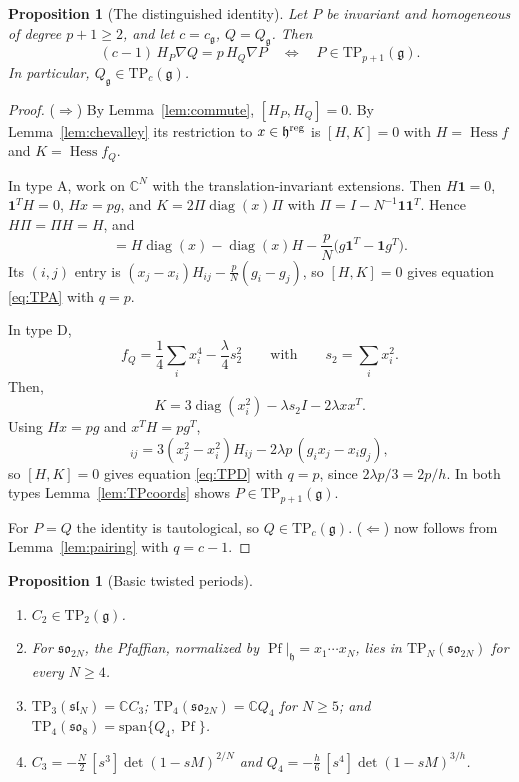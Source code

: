 \documentclass[10pt,reqno]{amsart}
\numberwithin{equation}{section}
\theoremstyle{plain}
\newtheorem{proposition}[theorem]{Proposition}
\theoremstyle{definition}
\DeclareMathOperator{\Pf}{Pf}
\DeclareMathOperator{\Hess}{Hess}
\DeclareMathOperator{\diag}{diag}
\newcommand{\TP}{\mathrm{TP}}
\begin{document}
\begin{proposition}[The distinguished identity]\label{prop:identity-TP}
Let $P$ be invariant and homogeneous of degree $p+1\ge2$, and let $c=c_\mathfrak{g}$, $Q=Q_\mathfrak{g}$. Then
\begin{equation}
	(c-1)\,H_P\nabla Q=p\,H_Q\nabla P\quad\Longleftrightarrow\quad P\in\TP_{p+1}(\mathfrak{g}).
\end{equation}
In particular, $Q_\mathfrak{g}\in\TP_c(\mathfrak{g})$.
\end{proposition}

\begin{proof}
($\Rightarrow$) By Lemma~\ref{lem:commute}, $[H_P,H_Q]=0$. By Lemma~\ref{lem:chevalley} its restriction to $x\in\mathfrak{h}^{\rm reg}$ is $[H,K]=0$ with $H=\Hess f$ and $K=\Hess f_Q$.

In type A, work on $\mathbb{C}^N$ with the translation-invariant extensions. Then $H\mathbf 1=0$, $\mathbf 1^TH=0$, $Hx=pg$, and $K=2\Pi\diag(x)\Pi$ with $\Pi=I-N^{-1}\mathbf 1\mathbf 1^T$. Hence $H\Pi=\Pi H=H$, and
\begin{equation*}
	[H,\Pi\diag(x)\Pi]=H\diag(x)-\diag(x)H-\frac pN\big(g\mathbf 1^T-\mathbf 1g^T\big).
\end{equation*}
Its $(i,j)$ entry is $(x_j-x_i)H_{ij}-\tfrac pN(g_i-g_j)$, so $[H,K]=0$ gives equation \eqref{eq:TPA} with $q=p$.

In type D,
\begin{equation*}
    f_Q=\frac14\sum_ix_i^4-\frac\lambda4s_2^2\qquad\text{with}\qquad s_2=\sum_ix_i^2.
\end{equation*}
Then,
\begin{equation*}
	K=3\diag(x_i^2)-\lambda s_2I-2\lambda xx^T .
\end{equation*}
Using $Hx=pg$ and $x^TH=pg^T$,
\begin{equation*}
	[H,K]_{ij}=3(x_j^2-x_i^2)H_{ij}-2\lambda p\,(g_ix_j-x_ig_j),
\end{equation*}
so $[H,K]=0$ gives equation \eqref{eq:TPD} with $q=p$, since $2\lambda p/3=2p/h$. In both types Lemma~\ref{lem:TPcoords} shows $P\in\TP_{p+1}(\mathfrak{g})$.

For $P=Q$ the identity is tautological, so $Q\in\TP_c(\mathfrak{g})$. ($\Leftarrow$) now follows from Lemma~\ref{lem:pairing} with $q=c-1$.
\end{proof}

\begin{proposition}[Basic twisted periods]\label{prop:basicTP}
\leavevmode
\begin{enumerate}[label=(\roman*)]
	\item $C_2\in\TP_2(\mathfrak{g})$.
	\item For $\mathfrak{so}_{2N}$, the Pfaffian, normalized by $\Pf|_\mathfrak{h}=x_1\cdots x_N$, lies in $\TP_N(\mathfrak{so}_{2N})$ for every $N\ge4$.
	\item $\TP_3(\mathfrak{sl}_N)=\mathbb{C} C_3$; $\TP_4(\mathfrak{so}_{2N})=\mathbb{C} Q_4$ for $N\ge5$; and $\TP_4(\mathfrak{so}_8)=\mathrm{span}\{Q_4,\Pf\}$.
	\item $C_3=-\tfrac N2\,[s^3]\det(1-sM)^{2/N}$ and $Q_4=-\tfrac h6\,[s^4]\det(1-sM)^{3/h}$.
\end{enumerate}
\end{proposition}
\end{document}
